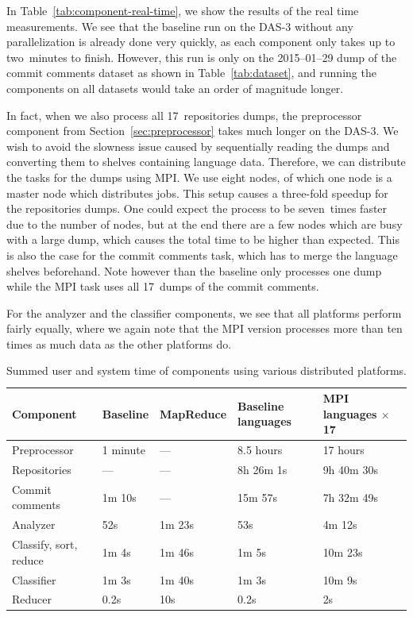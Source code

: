 \documentclass{article}
\begin{document}
In Table~\ref{tab:component-real-time}, we show the results of the real time 
measurements. We see that the baseline run on the DAS-3 without any 
parallelization is already done very quickly, as each component only takes up 
to two~minutes to finish. However, this run is only on the 2015--01--29 dump of 
the commit comments dataset as shown in Table~\ref{tab:dataset}, and running 
the components on all datasets would take an order of magnitude longer.

In fact, when we also process all 17~repositories dumps, the preprocessor 
component from Section~\ref{sec:preprocessor} takes much longer on the DAS-3. 
We wish to avoid the slowness issue caused by sequentially reading the dumps 
and converting them to shelves containing language data. Therefore, we can 
distribute the tasks for the dumps using MPI. We use eight nodes, of which one 
node is a master node which distributes jobs. This setup causes a three-fold 
speedup for the repositories dumps. One could expect the process to be 
seven~times faster due to the number of nodes, but at the end there are a few 
nodes which are busy with a large dump, which causes the total time to be 
higher than expected. This is also the case for the commit comments task, which 
has to merge the language shelves beforehand. Note however than the baseline 
only processes one dump while the MPI task uses all 17~dumps of the commit 
comments.

For the analyzer and the classifier components, we see that all platforms 
perform fairly equally, where we again note that the MPI version processes more 
than ten times as much data as the other platforms do.

\begin{table}[h!]
  \centering
  \begin{tabular}{l l l l l}
    \toprule
    \textbf{Component} & \textbf{Baseline} & \textbf{MapReduce} &
    \textbf{Baseline languages} & \textbf{MPI languages $\times$ 17} \\
    \midrule
    Preprocessor           & 1 minute  & ---    & 8.5 hours   & 17 hours   \\
    \quad Repositories     & ---       & ---    & 8h 26m 1s   & 9h 40m 30s \\
    \quad Commit comments  & 1m 10s    & ---    & 15m 57s     & 7h 32m 49s \\
    Analyzer               & 52s       & 1m 23s & 53s         & 4m 12s     \\
    Classify, sort, reduce & 1m 4s     & 1m 46s & 1m 5s       & 10m 23s    \\
    \quad Classifier       & 1m 3s     & 1m 40s & 1m 3s       & 10m 9s     \\
    \quad Reducer          & 0.2s      & 10s    & 0.2s        & 2s         \\
    \bottomrule
  \end{tabular}
  \caption{Summed user and system time of components using various distributed 
  platforms.}
  \label{tab:component-user-sys-time}
\end{table}
\end{document}
